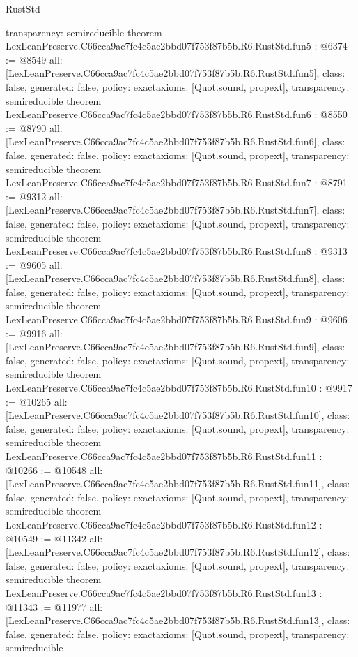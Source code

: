 \begin{lexlean}{RustStd}
\begin{coremodule}
{  transparency: semireducible
}
theorem LexLeanPreserve.C66cca9ac7fc4c5ae2bbd07f753f87b5b.R6.RustStd.fun5 : @6374 := @8549 {
  all: [LexLeanPreserve.C66cca9ac7fc4c5ae2bbd07f753f87b5b.R6.RustStd.fun5],
  class: false,
  generated: false,
  policy: exact{axioms: [Quot.sound, propext]},
  transparency: semireducible
}
theorem LexLeanPreserve.C66cca9ac7fc4c5ae2bbd07f753f87b5b.R6.RustStd.fun6 : @8550 := @8790 {
  all: [LexLeanPreserve.C66cca9ac7fc4c5ae2bbd07f753f87b5b.R6.RustStd.fun6],
  class: false,
  generated: false,
  policy: exact{axioms: [Quot.sound, propext]},
  transparency: semireducible
}
theorem LexLeanPreserve.C66cca9ac7fc4c5ae2bbd07f753f87b5b.R6.RustStd.fun7 : @8791 := @9312 {
  all: [LexLeanPreserve.C66cca9ac7fc4c5ae2bbd07f753f87b5b.R6.RustStd.fun7],
  class: false,
  generated: false,
  policy: exact{axioms: [Quot.sound, propext]},
  transparency: semireducible
}
theorem LexLeanPreserve.C66cca9ac7fc4c5ae2bbd07f753f87b5b.R6.RustStd.fun8 : @9313 := @9605 {
  all: [LexLeanPreserve.C66cca9ac7fc4c5ae2bbd07f753f87b5b.R6.RustStd.fun8],
  class: false,
  generated: false,
  policy: exact{axioms: [Quot.sound, propext]},
  transparency: semireducible
}
theorem LexLeanPreserve.C66cca9ac7fc4c5ae2bbd07f753f87b5b.R6.RustStd.fun9 : @9606 := @9916 {
  all: [LexLeanPreserve.C66cca9ac7fc4c5ae2bbd07f753f87b5b.R6.RustStd.fun9],
  class: false,
  generated: false,
  policy: exact{axioms: [Quot.sound, propext]},
  transparency: semireducible
}
theorem LexLeanPreserve.C66cca9ac7fc4c5ae2bbd07f753f87b5b.R6.RustStd.fun10 : @9917 := @10265 {
  all: [LexLeanPreserve.C66cca9ac7fc4c5ae2bbd07f753f87b5b.R6.RustStd.fun10],
  class: false,
  generated: false,
  policy: exact{axioms: [Quot.sound, propext]},
  transparency: semireducible
}
theorem LexLeanPreserve.C66cca9ac7fc4c5ae2bbd07f753f87b5b.R6.RustStd.fun11 : @10266 := @10548 {
  all: [LexLeanPreserve.C66cca9ac7fc4c5ae2bbd07f753f87b5b.R6.RustStd.fun11],
  class: false,
  generated: false,
  policy: exact{axioms: [Quot.sound, propext]},
  transparency: semireducible
}
theorem LexLeanPreserve.C66cca9ac7fc4c5ae2bbd07f753f87b5b.R6.RustStd.fun12 : @10549 := @11342 {
  all: [LexLeanPreserve.C66cca9ac7fc4c5ae2bbd07f753f87b5b.R6.RustStd.fun12],
  class: false,
  generated: false,
  policy: exact{axioms: [Quot.sound, propext]},
  transparency: semireducible
}
theorem LexLeanPreserve.C66cca9ac7fc4c5ae2bbd07f753f87b5b.R6.RustStd.fun13 : @11343 := @11977 {
  all: [LexLeanPreserve.C66cca9ac7fc4c5ae2bbd07f753f87b5b.R6.RustStd.fun13],
  class: false,
  generated: false,
  policy: exact{axioms: [Quot.sound, propext]},
  transparency: semireducible
}
\end{coremodule}
\end{lexlean}
